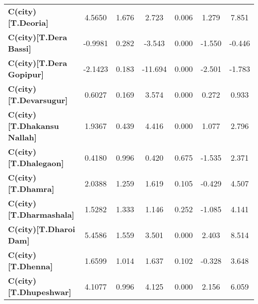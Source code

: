 \begin{center}
\begin{tabular}{lcccccc}
\textbf{C(city)[T.Deoria]}                                                                          &       4.5650  &        1.676     &     2.723  &         0.006        &        1.279    &        7.851     \\
\textbf{C(city)[T.Dera Bassi]}                                                                      &      -0.9981  &        0.282     &    -3.543  &         0.000        &       -1.550    &       -0.446     \\
\textbf{C(city)[T.Dera Gopipur]}                                                                    &      -2.1423  &        0.183     &   -11.694  &         0.000        &       -2.501    &       -1.783     \\
\textbf{C(city)[T.Devarsugur]}                                                                      &       0.6027  &        0.169     &     3.574  &         0.000        &        0.272    &        0.933     \\
\textbf{C(city)[T.Dhakansu Nallah]}                                                                 &       1.9367  &        0.439     &     4.416  &         0.000        &        1.077    &        2.796     \\
\textbf{C(city)[T.Dhalegaon]}                                                                       &       0.4180  &        0.996     &     0.420  &         0.675        &       -1.535    &        2.371     \\
\textbf{C(city)[T.Dhamra]}                                                                          &       2.0388  &        1.259     &     1.619  &         0.105        &       -0.429    &        4.507     \\
\textbf{C(city)[T.Dharmashala]}                                                                     &       1.5282  &        1.333     &     1.146  &         0.252        &       -1.085    &        4.141     \\
\textbf{C(city)[T.Dharoi Dam]}                                                                      &       5.4586  &        1.559     &     3.501  &         0.000        &        2.403    &        8.514     \\
\textbf{C(city)[T.Dhenna]}                                                                          &       1.6599  &        1.014     &     1.637  &         0.102        &       -0.328    &        3.648     \\
\textbf{C(city)[T.Dhupeshwar]}                                                                      &       4.1077  &        0.996     &     4.125  &         0.000        &        2.156    &        6.059     \\

\end{tabular}
\end{center}
